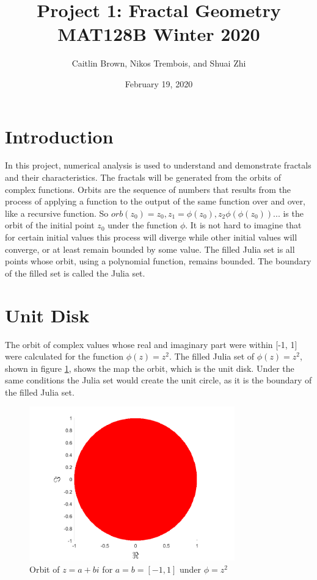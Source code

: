 \documentclass[letterpaper,11pt]{article}
\begin{document}
\title{Project 1: Fractal Geometry \\ 
		\large MAT128B Winter 2020}
\author{Caitlin Brown, Nikos Trembois, and Shuai Zhi}
\date{February 19, 2020}
\maketitle
\tableofcontents
\newpage

\section{Introduction}
In this project, numerical analysis is used to understand and demonstrate fractals and their characteristics. The fractals will be generated from the orbits of complex functions. Orbits are the sequence of numbers that results from the process of applying a function to the output of the same function over and over, like a recursive function. So $orb(z_0) = z_0, z_1 = \phi(z_0), z_2 \phi(\phi(z_0)) ...$ is the orbit of the initial point $z_0$ under the function $\phi$. It is not hard to imagine that for certain initial values this process will diverge while other initial values will converge, or at least remain bounded by some value. The filled Julia set is all points whose orbit, using a polynomial function, remains bounded. The boundary of the filled set is called the Julia set.

\section{Unit Disk}
The orbit of complex values whose real and imaginary part were within [-1, 1] were calculated for the function $\phi(z) = z^2$. The filled Julia set of $\phi(z) = z^2$, shown in figure \ref{fig:unitDisk}, shows the map the orbit, which is the unit disk. Under the same conditions the Julia set would create the unit circle, as it is the boundary of the filled Julia set. 

\begin{figure}
	\centering
	\includegraphics[width=3.5in]{../Figures/UnitDisk.png}
	\caption{Orbit of $z = a + bi$ for $a = b = [-1,1]$ under $\phi=z^2$}
	\label{fig:unitDisk}
\end{figure}
\end{document}
